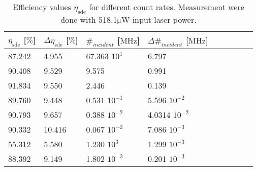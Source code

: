 
\begin{table}[!hbt]
    \centering
    \begin{tabular}{|l|l|l|l|l|l|l|l|l|}
    \hline
         $\eta_{\text{sde}} $ [$\%$] &  $ \Delta \eta_{\text{sde}} $ [$\%$] & $ \#_{incident} $ [$\si{\mega \Hz}$]
    & $ \Delta \#_{incident} $ [$\si{\mega \Hz}$] \\ \hline
        87.242 & 4.955  & 67.363 $10^{1}$   & 6.797\\ \hline
        90.408 & 9.529  & 9.575            & 0.991\\ \hline
        91.834 & 9.550  & 2.446            & 0.139\\ \hline
        89.760 & 9.448  & 0.531 $10^{-1}$  & 5.596  $10^{-2}$\\ \hline
        90.793 & 9.657  & 0.388 $10^{-2}$  & 4.0314 $10^{-2}$\\ \hline
        90.332 & 10.416 & 0.067 $10^{-2}$  & 7.086 $10^{-3}$\\ \hline
        55.312 & 5.580  & 1.230 $10^{3}$   & 1.299 $10^{-3}$\\ \hline
        88.392 & 9.149  & 1.802 $10^{-3}$  & 0.201 $10^{-3}$\\ \hline
    \end{tabular}
    \caption{ Efficiency values $\eta_{\text{sde}}$ for different count rates.
    Measurement were done with 518.1$ \si{\micro \W}$ input laser power.}
    \label{tab:sde_count_rate_table}
\end{table}